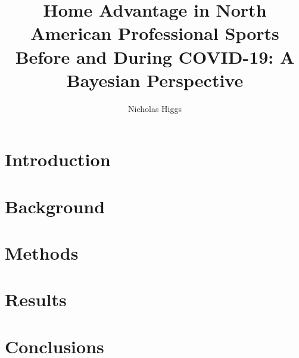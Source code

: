 \documentclass{uofsthesis-cs}
\title{Home Advantage in North American Professional Sports Before and During COVID-19: A Bayesian Perspective}
\author{Nicholas Higgs}
\begin{document}
\maketitle
{}

\frontmatter


\chapter{Introduction}



%
% 
% 
%


\chapter{Background}


\chapter{Methods}


\chapter{Results}


\chapter{Conclusions}



\end{document}
